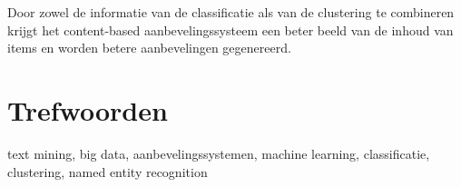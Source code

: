 {Door zowel de informatie van de classificatie als van de clustering te combineren krijgt het content-based aanbevelingssysteem een beter beeld van de inhoud van items en worden betere aanbevelingen gegenereerd. 

\section*{Trefwoorden}

text mining, big data, aanbevelingssystemen, machine learning, classificatie, clustering, named entity recognition

}

\newpage %
